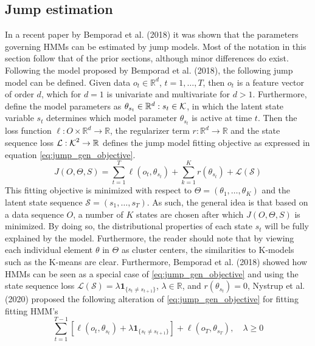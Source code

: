 \subsection{Jump estimation}
\label{subsection: Jump theory}
In a recent paper by Bemporad et al. (2018) it was shown that the parameters governing HMMs can be estimated by jump models. Most of the notation in this section follow that of the prior sections, although minor differences do exist. Following the model proposed by Bemporad et al. (2018), the following jump model can be defined. Given data $o_t\in \mathbb{R}^d$, $t=1,\ldots,T$, then $o_t$ is a feature vector of order $d$, which for $d=1$ is univariate and multivariate for $d>1$. Furthermore, define the model parameters as $\theta_{s_t}\in \mathbb{R}^d:s_t\in\operatorname{\mathcal{K}}$, in which the latent state variable $s_t$ determines which model parameter $\theta_{s_t}$ is active at time $t$. Then the loss function $\ell: O\times\mathbb{R}^d \rightarrow\mathbb{R}$, the regularizer term $r: \mathbb{R}^d \rightarrow \mathbb{R}$ and the state sequence loss $\mathcal{L}:\operatorname{\mathcal{K}}^2 \rightarrow \mathbb{R}$ defines the jump model fitting objective as expressed in equation \ref{eq:jump_gen_objective}.
\begin{equation}
    J(O, \Theta, S) = \sum_{t=1}^T \ell(o_t,\theta_{s_t}) + \sum_{k=1}^K r(\theta_{s_t}) + \mathcal{L(S)}
\label{eq:jump_gen_objective}    
\end{equation}
This fitting objective is minimized with respect to $\Theta=(\theta_1,\ldots,\theta_K)$ and the latent state sequence $\mathcal{S}=(s_1,\ldots,s_T)$. As such, the general idea is that based on a data sequence $O$, a number of $K$ states are chosen after which $J(O, \Theta, S)$ is minimized. By doing so, the distributional properties of each state $s_t$ will be fully explained by the model. Furthermore, the reader should note that by viewing each individual element $\theta$ in $\Theta$ as cluster centers, the similarities to K-models such as the K-means are clear. Furthermore, Bemporad et al. (2018) showed how HMMs can be seen as a special case of \cref{eq:jump_gen_objective} and using the state sequence loss $\mathcal{L(S)} = \lambda\mathbf{1}_{\{ s_t\ne s_{t+1}\}}$, $\lambda \in \mathbb{R}$, and $r(\theta_{s_t})=0$, Nystrup et al. (2020) proposed the following alteration of \cref{eq:jump_gen_objective} for fitting fitting HMM's
\begin{equation}
    \sum_{t=1}^{T-1}[\ell(o_t, \theta_{s_t}) + \lambda\mathbf{1}_{\{ s_t\ne s_{t+1} \}}]
    + \ell(o_T, \theta_{s_T})
    ,\quad \lambda \geq 0
\label{eq:jump_objective}
\end{equation}

